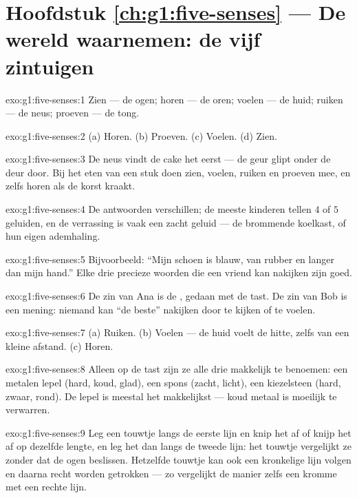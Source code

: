 \section*{Hoofdstuk \ref{ch:g1:five-senses} --- De wereld waarnemen: de vijf zintuigen}

\begin{solution}{exo:g1:five-senses:1}
Zien --- de ogen; horen --- de oren; voelen --- de huid; ruiken
--- de neus; proeven --- de tong.
\end{solution}

\begin{solution}{exo:g1:five-senses:2}
(a) Horen. (b) Proeven. (c) Voelen. (d) Zien.
\end{solution}

\begin{solution}{exo:g1:five-senses:3}
De neus vindt de cake het eerst --- de geur glipt onder de deur door.
Bij het eten van een stuk doen zien, voelen, ruiken en proeven mee, en
zelfs horen als de korst kraakt.
\end{solution}

\begin{solution}{exo:g1:five-senses:4}
De antwoorden verschillen; de meeste kinderen tellen $4$ of $5$
geluiden, en de verrassing is vaak een zacht geluid --- de brommende
koelkast, of hun eigen ademhaling.
\end{solution}

\begin{solution}{exo:g1:five-senses:5}
Bijvoorbeeld: ``Mijn schoen is blauw, van rubber en langer dan mijn
hand.'' Elke drie precieze woorden die een vriend kan nakijken zijn
goed.
\end{solution}

\begin{solution}{exo:g1:five-senses:6}
De zin van Ana is de , gedaan met de tast. De zin van Bob is
een mening: niemand kan ``de beste'' nakijken door te kijken of te
voelen.
\end{solution}

\begin{solution}{exo:g1:five-senses:7}
(a) Ruiken. (b) Voelen --- de huid voelt de hitte, zelfs van een
kleine afstand. (c) Horen.
\end{solution}

\begin{solution}{exo:g1:five-senses:8}
Alleen op de tast zijn ze alle drie makkelijk te benoemen: een
metalen lepel (hard, koud, glad), een spons (zacht, licht), een
kiezelsteen (hard, zwaar, rond). De lepel is meestal het makkelijkst
--- koud metaal is moeilijk te verwarren.
\end{solution}

\begin{solution}{exo:g1:five-senses:9}
Leg een touwtje langs de eerste lijn en knip het af of knijp het af
op dezelfde lengte, en leg het dan langs de tweede lijn: het touwtje
vergelijkt ze zonder dat de ogen beslissen. Hetzelfde touwtje kan ook
een kronkelige lijn volgen en daarna recht worden getrokken --- zo
vergelijkt de manier zelfs een kromme met een rechte lijn.
\end{solution}
